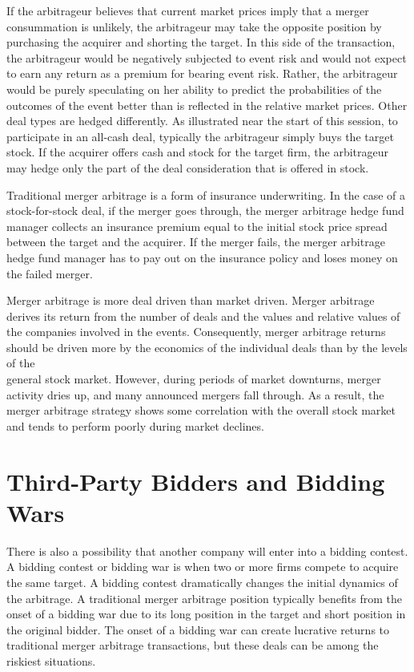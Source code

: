 \documentclass[11pt]{article}
\begin{document}
If the arbitrageur believes that current market prices imply that a merger consummation is unlikely, the arbitrageur may take the opposite position by purchasing the acquirer and shorting the target. In this side of the transaction, the arbitrageur would be negatively subjected to event risk and would not expect to earn any return as a premium for bearing event risk. Rather, the arbitrageur would be purely speculating on her ability to predict the probabilities of the outcomes of the event better than is reflected in the relative market prices. Other deal types are hedged differently. As illustrated near the start of this session, to participate in an all-cash deal, typically the arbitrageur simply buys the target stock. If the acquirer offers cash and stock for the target firm, the arbitrageur may hedge only the part of the deal consideration that is offered in stock.

Traditional merger arbitrage is a form of insurance underwriting. In the case of a stock-for-stock deal, if the merger goes through, the merger arbitrage hedge fund manager collects an insurance premium equal to the initial stock price spread between the target and the acquirer. If the merger fails, the merger arbitrage hedge fund manager has to pay out on the insurance policy and loses money on the failed merger.

Merger arbitrage is more deal driven than market driven. Merger arbitrage derives its return from the number of deals and the values and relative values of the companies involved in the events. Consequently, merger arbitrage returns should be driven more by the economics of the individual deals than by the levels of the\\
general stock market. However, during periods of market downturns, merger activity dries up, and many announced mergers fall through. As a result, the merger arbitrage strategy shows some correlation with the overall stock market and tends to perform poorly during market declines.

\section*{Third-Party Bidders and Bidding Wars}
There is also a possibility that another company will enter into a bidding contest. A bidding contest or bidding war is when two or more firms compete to acquire the same target. A bidding contest dramatically changes the initial dynamics of the arbitrage. A traditional merger arbitrage position typically benefits from the onset of a bidding war due to its long position in the target and short position in the original bidder. The onset of a bidding war can create lucrative returns to traditional merger arbitrage transactions, but these deals can be among the riskiest situations.
\end{document}
